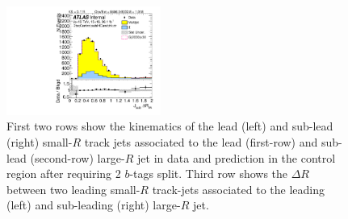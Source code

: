 \begin{figure}[htbp!]
\begin{center}
\includegraphics[width=0.45\textwidth,angle=-90]{figures/boosted/Control/b77_TwoTag_split_Control_sublHCand_trk_dr.pdf}
  \caption{First two rows show the kinematics of the lead (left) and sub-lead (right) small-$R$ track jets associated to the lead (first-row) and sub-lead (second-row) large-$R$ jet in data and prediction in the control region after requiring 2 $b$-tags split. Third row shows the $\Delta R$ between two leading small-$R$ track-jets associated to the leading (left) and sub-leading (right) large-$R$ jet.  }
  \label{fig:boosted-2bs-control-ak2}
\end{center}
\end{figure}


